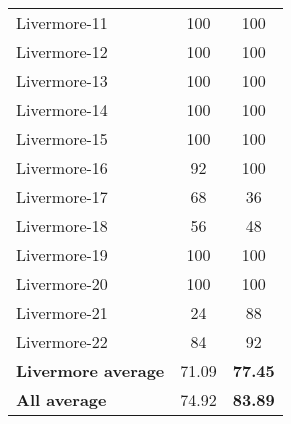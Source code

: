 \documentclass{article}
\begin{document}
\begin{table}[htbp]
\begin{tabular}{lcc}
    Livermore-11 & 100 & 100 \\
    Livermore-12 & 100 & 100 \\
    Livermore-13 & 100 & 100 \\
    Livermore-14 & 100 & 100 \\
    Livermore-15 & 100 & 100 \\
    Livermore-16 & 92 & 100 \\
    Livermore-17 & 68 & 36 \\
    Livermore-18 & 56 & 48 \\
    Livermore-19 & 100 & 100 \\
    Livermore-20 & 100 & 100 \\
    Livermore-21 & 24 & 88 \\
    Livermore-22 & 84 & 92 \\
    \midrule
    \textbf{Livermore average} & 71.09 & \textbf{77.45} \\
    \midrule
    \textbf{All average} & 74.92 & \textbf{83.89} \\
    \midrule
    \end{tabular}%
  \label{tab:slp_her}%
\end{table}%
\end{document}
